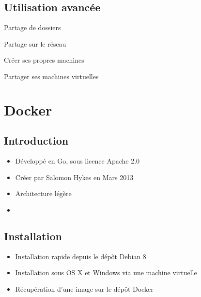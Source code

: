 \documentclass{beamer}
\begin{document}
    \subsection{Utilisation avancée}
    \begin{frame}{Partage de dossiers}
    \end{frame}

    \begin{frame}{Partage sur le réseau}
    \end{frame}

    \begin{frame}{Créer ses propres machines}
    \end{frame}

    \begin{frame}{Partager ses machines virtuelles}
    \end{frame}

    
    \section{Docker}
    \subsection{Introduction}
    \begin{frame}
       \begin{itemize}
          \item{Développé en Go, sous licence Apache 2.0}
          \item{Créer par Salomon Hykes en Mars 2013}
          \item{Architecture légère}
          \item{}
       \end{itemize}
    \end{frame}

    \subsection{Installation}
    \begin{frame}
       \begin{itemize}
          \item{Installation rapide depuis le dépôt Debian 8}
          \item{Installation sous OS X et Windows via une machine virtuelle}
          \item{Récupération d'une image sur le dépôt Docker}
       \end{itemize}
    \end{frame}
\end{document}
